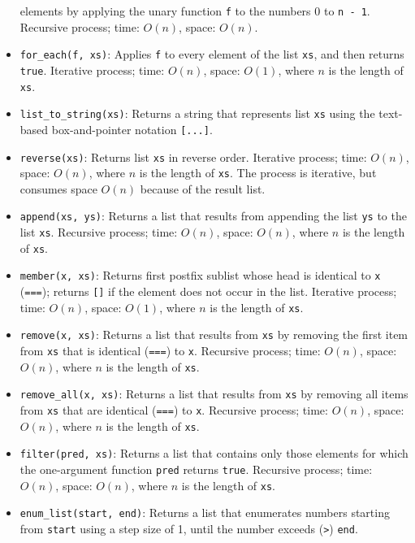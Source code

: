 \begin{itemize}
elements by applying the unary function \lstinline{f} to the numbers 0 to \lstinline{n - 1}.
Recursive process; time: $O(n)$, space: $O(n)$.
\item \lstinline{for_each(f, xs)}: Applies \lstinline{f} to every
  element of the list \lstinline{xs}, and then returns
  \lstinline{true}. 
Iterative process; time: $O(n)$, space: $O(1)$, where $n$ is the length of \lstinline{xs}.
\item \lstinline{list_to_string(xs)}: Returns a string that represents
list \lstinline{xs} using the text-based box-and-pointer notation \lstinline{[...]}.
\item \lstinline{reverse(xs)}: Returns list \lstinline{xs} in reverse
  order. Iterative process; time: $O(n)$, space: $O(n)$, where $n$ is the length of \lstinline{xs}.
The process is iterative, but consumes space $O(n)$ because of the result list.
\item \lstinline{append(xs, ys)}: Returns a list that results from 
appending the list \lstinline{ys} to the list \lstinline{xs}.
Recursive process; time: $O(n)$, space: $O(n)$, where $n$ is the length of \lstinline{xs}.
\item \lstinline{member(x, xs)}: Returns first postfix sublist
whose head is identical to
\lstinline{x} (\lstinline{===}); returns \lstinline{[]} if the
element does not occur in the list.
Iterative process; time: $O(n)$, space: $O(1)$, where $n$ is the length of \lstinline{xs}.
\item \lstinline{remove(x, xs)}: Returns a list that results from
\lstinline{xs} by removing the first item from \lstinline{xs} that
is identical (\lstinline{===}) to \lstinline{x}. Recursive process;
time: $O(n)$, space: $O(n)$, where $n$ is the length of \lstinline{xs}.
\item \lstinline{remove_all(x, xs)}: Returns a list that results from
\lstinline{xs} by removing all items from \lstinline{xs} that
are identical (\lstinline{===}) to \lstinline{x}.
Recursive process;
time: $O(n)$, space: $O(n)$, where $n$ is the length of \lstinline{xs}.
\item \lstinline{filter(pred, xs)}: Returns a list that contains
only those elements for which the one-argument function
\lstinline{pred}
returns \lstinline{true}.
Recursive process;
time: $O(n)$, space: $O(n)$, where $n$ is the length of \lstinline{xs}.
\item \lstinline{enum_list(start, end)}: Returns a list that enumerates
numbers starting from \lstinline{start} using a step size of 1, until
the number exceeds (\lstinline{>}) \lstinline{end}.

\end{itemize}
